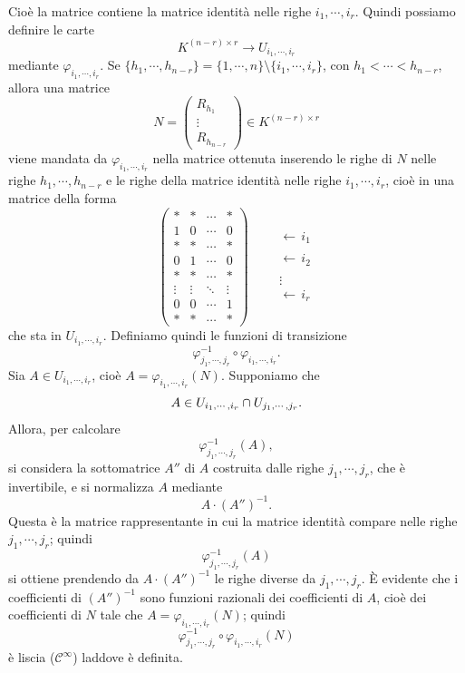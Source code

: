 \documentclass[a4paper]{article}
\begin{document}
Cioè la matrice contiene la matrice identità nelle righe \(i_1, \cdots, i_r\).
Quindi possiamo definire le carte
\[
    K^{(n-r) \times r} \to U_{i_1, \cdots, i_r}
\]
mediante \(\varphi_{i_1, \cdots, i_r}\).
Se \(\{h_1, \cdots, h_{n-r}\} = \{1, \cdots, n\} \setminus \{i_1, \cdots, i_r\}\),
con \(h_1 < \cdots < h_{n-r}\), allora una matrice
\[
    N =
    \begin{pmatrix}
        R_{h_1} \\
        \vdots \\
        R_{h_{n-r}}
    \end{pmatrix}
    \in K^{(n-r)\times r}
\]
viene mandata da \(\varphi_{i_1,\cdots,i_r}\) nella matrice ottenuta inserendo
le righe di \(N\) nelle righe \(h_1,\cdots,h_{n-r}\) e le righe della matrice identità
nelle righe \(i_1,\cdots,i_r\), cioè in una matrice della forma
\[
    \begin{pmatrix}
        \ast & \ast & \cdots & \ast \\
        1 & 0 & \cdots & 0 \\
        \ast & \ast & \cdots & \ast \\
        0 & 1 & \cdots & 0 \\
        \ast & \ast & \cdots & \ast \\
        \vdots & \vdots & \ddots & \vdots \\
        0 & 0 & \cdots & 1 \\
        \ast & \ast & \cdots & \ast
    \end{pmatrix}
    \qquad
    \begin{array}{l}
        \\[-1.2em]
        \leftarrow\, i_1 \\
        \\[-0.2em]
        \leftarrow\, i_2 \\
        \\
        \vdots \\
        \leftarrow\, i_r \\
    \end{array}
\]
che sta in \(U_{i_1, \cdots, i_r}\).
Definiamo quindi le funzioni di transizione
\[
    \varphi_{j_1, \cdots, j_r}^{-1} \circ \varphi_{i_1, \cdots, i_r}.
\]
Sia \(A \in U_{i_1, \cdots, i_r}\), cioè
\(A = \varphi_{i_1, \cdots, i_r}(N)\).
Supponiamo che
\[
    A \in U_{i_1, \cdots, i_r} \cap U_{j_1, \cdots, j_r}.
\]
Allora, per calcolare
\[
    \varphi_{j_1, \cdots, j_r}^{-1}(A),
\]
si considera la sottomatrice \(A''\) di \(A\)
costruita dalle righe \(j_1, \cdots, j_r\), che è invertibile, e si normalizza \(A\) mediante
\[
    A \cdot (A'')^{-1}.
\]
Questa è la matrice rappresentante in cui la matrice identità compare nelle righe
\(j_1, \cdots, j_r\); quindi
\[
    \varphi_{j_1, \cdots, j_r}^{-1}(A)
\]
si ottiene prendendo da \(A \cdot (A'')^{-1}\) le righe diverse da
\(j_1, \cdots, j_r\).
È evidente che i coefficienti di \((A'')^{-1}\)
sono funzioni razionali dei coefficienti di \(A\),
cioè dei coefficienti di \(N\) tale che \(A = \varphi_{i_1, \cdots, i_r}(N)\);
quindi
\[
    \varphi_{j_1, \cdots, j_r}^{-1} \circ \varphi_{i_1, \cdots, i_r}(N)
\]
è liscia (\(\mathcal C^\infty\)) laddove è definita.
\end{document}

